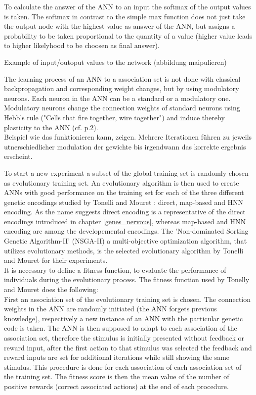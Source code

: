 \documentclass[12pt,twoside]{article}
\theoremstyle{plain}
\theoremstyle{definition}
\theoremstyle{remark}
\begin{document}
To calculate the answer of the ANN to an input the softmax of the output values is taken. The softmax in contrast to the simple max function does not just take the output node with the highest value as answer of the ANN, but assigns a probability to be taken proportional to the quantity of a value (higher value leads to higher likelyhood to be choosen as final answer).\medskip

Example of input/outoput values to the network (abbildung maipulieren)\medskip

The learning process of an ANN to a association set is not done with classical backpropagation and corresponding weight changes, but by using modulatory neurons.
Each neuron in the ANN can be a standard or a modulatory one.
Modulatory neurons change the connection weights of standard neurons using Hebb's rule ("Cells that fire together, wire together") and induce thereby plasticity to the ANN (cf. \cite{citeulike:12788284} p.2).\\
Beispiel wie das funktionieren kann, zeigen. Mehrere Iterationen führen zu jeweils utnerschiedlicher modulation der gewichte bis irgendwann das korrekte ergebnis erscheint. \medskip

To start a new experiment a subset of the global training set is randomly chosen as evolutionary training set.
An evolutionary algorithm is then used to create ANNs with good performance on the training set for each of the three different genetic encodings studied by Tonelli and Mouret : direct, map-based and HNN encoding. As the name suggests direct encoding is a representative of the direct encodings introduced in chapter \ref{genes_nervous}, whereas map-based and HNN encoding are among the developemental encodings.
The 'Non-dominated Sorting Genetic Algorithm-II' (NSGA-II) a multi-objective optimization algorithm, that utilizes evolutionary methods, is the selected evolutionary algorithm by Tonelli and Mouret for their experiments.\\
It is necessary to define a fitness function, to evaluate the performance of individuals during the evolutionary process. The fitness function used by Tonelly and Mouret does the following:\\
First an association set of the evolutionary training set is chosen. The connection weights in the ANN are randomly initiated (the ANN forgets previous knowledge), respectively a new instance of an ANN with the particular genetic code is taken. The ANN is then supposed to adapt to each association of the association set, therefore the stimulus is initially presented without feedback or reward input, after the first action to that stimulus was selected the feedback and reward inputs are set for additional iterations while still showing the same stimulus. This procedure is done for each association of each association set of the training set. The fitness score is then the mean value of the number of positive rewards (correct associated actions) at the end of each procedure.\medskip
\end{document}
